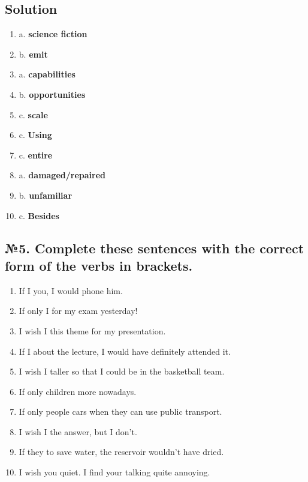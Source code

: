 \subsection*{Solution}
\begin{enumerate}
      \item a. \textbf{science fiction}
      \item b. \textbf{emit}
      \item a. \textbf{capabilities}
      \item b. \textbf{opportunities}
      \item c. \textbf{scale}
      \item c. \textbf{Using}
      \item c. \textbf{entire}
      \item a. \textbf{damaged/repaired}
      \item b. \textbf{unfamiliar}
      \item c. \textbf{Besides}
\end{enumerate}

\subsection*{№5. Complete these sentences with the correct form of the verbs in brackets.}
\begin{enumerate}
      \item If I \underline{\hspace{2cm}} you, I would phone him.
      \item If only I \underline{\hspace{2cm}} for my exam yesterday!
      \item I wish I \underline{\hspace{2cm}} this theme for my presentation.
      \item If I \underline{\hspace{2cm}} about the lecture, I would have definitely attended it.
      \item I wish I \underline{\hspace{2cm}} taller so that I could be in the basketball team.
      \item If only children \underline{\hspace{2cm}} more nowadays.
      \item If only people \underline{\hspace{2cm}} cars when they can use public transport.
      \item I wish I \underline{\hspace{2cm}} the answer, but I don’t.
      \item If they \underline{\hspace{2cm}} to save water, the reservoir wouldn’t have dried.
      \item I wish you \underline{\hspace{2cm}} quiet. I find your talking quite annoying.
\end{enumerate}

